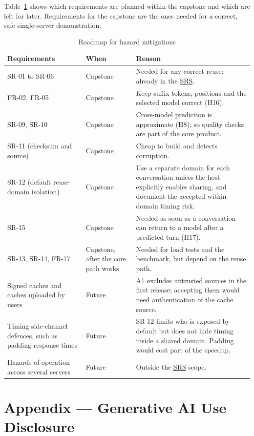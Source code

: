 \documentclass{article}
\newcommand{\srs}{\href{https://tandemkv.github.io/Tandem/SRS-Volere/SRS.pdf}{SRS}}
\begin{document}
Table~\ref{tab:roadmap} shows which requirements are planned within the
capstone and which are left for later. Requirements for the capstone are
the ones needed for a correct, safe single-server demonstration.

\begin{table}[h]
\centering
\caption{Roadmap for hazard mitigations}
\label{tab:roadmap}
\begin{tabularx}{\textwidth}{@{}p{}p{}X@{}}
\toprule Requirements & When & Reason\\\midrule
SR-01 to SR-06 & Capstone & Needed for any correct reuse; already in the
\srs{}.\\
FR-02, FR-05 & Capstone & Keep suffix tokens, positions and the selected
model correct (H16).\\
SR-09, SR-10 & Capstone & Cross-model prediction is approximate (H8), so
quality checks are part of the core product.\\
SR-11 (checksum and source) & Capstone & Cheap to build and detects
corruption.\\
SR-12 (default reuse-domain isolation) & Capstone & Use a separate domain for
each conversation unless the host explicitly enables sharing, and document the
accepted within-domain timing risk.\\
SR-15 & Capstone & Needed as soon as a conversation can return to a model
after a predicted turn (H17).\\
SR-13, SR-14, FR-17 & Capstone, after the core path works & Needed for load
tests and the benchmark, but depend on the reuse path.\\
Signed caches and caches uploaded by users & Future & A1 excludes untrusted
sources in the first release; accepting them would need authentication of
the cache source.\\
Timing side-channel defences, such as padding response times & Future &
SR-12 limits who is exposed by default but does not hide timing inside a shared
domain. Padding would cost part of the speedup.\\
Hazards of operation across several servers & Future & Outside the
\srs{} scope.\\
\bottomrule
\end{tabularx}
\end{table}




\newpage{}

\section{Appendix --- Generative AI Use Disclosure}
\end{document}
